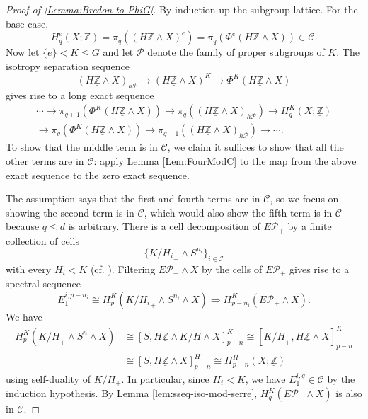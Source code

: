 \documentclass[11pt]{amsart}
\theoremstyle{definition}
\numberwithin{equation}{subsection} %
\newcommand{\sm}{\wedge}
\newcommand{\Z}{\mathbb{Z}}
\begin{document}
\begin{proof}[Proof of \cref{Lemma:Bredon-to-PhiG}]
By induction up the subgroup lattice. For the base case, 
$$ H^e_q(X; \underline{\Z}) = \pi_q((H\underline{\Z}\sm X)^e) =
\pi_q(\Phi^e(H\underline{\Z}\sm X)) \in \mathcal{C}. $$
Now let $\{ e \} < K\leq G$ and let $\mathcal{P}$ denote the family of proper
subgroups of $K$.
The isotropy separation sequence
$$ (H\underline{\Z}\sm X)_{h\mathcal{P}}\to
(H\underline{\Z}\sm X)^K\to \Phi^K(H\underline{\Z}\sm X)$$
gives rise to a long exact sequence
\begin{gather*}
\cdots \to \pi_{q+1}(\Phi^K(H\underline{\Z}\sm X))\to \pi_q((H\underline{\Z}\sm X)_{h\mathcal{P}}) \to H^K_q(X; \underline{\Z}) 
\\\to \pi_q(\Phi^K(H\underline{\Z}\sm X)) \to \pi_{q-1}((H\underline{\Z}\sm X)_{h\mathcal{P}}) \to \cdots. 
\end{gather*}
To show that the middle term is in $\mathcal{C}$, we claim it suffices to show that all
the other terms are in $\mathcal{C}$: apply Lemma \ref{Lem:FourModC}
to the map from the above exact sequence to the zero exact sequence.

The assumption says that the first and fourth terms are in $\mathcal{C}$, so we
focus on showing the second term is in $\mathcal{C}$, which would also show the fifth
term is in $\mathcal{C}$ because $q\leq d$ is arbitrary.
There is a cell decomposition of $E\mathcal{P}_+$ by a finite collection of
cells
$$ \{ {K/H_i}_+ \sm S^{n_i} \}_{i\in \mathcal{I}} $$
with every $H_i < K$ (cf. \cite[Section 2.5.2]{HHR16}). Filtering $E\mathcal{P}_+\sm X$ by the cells of
$E\mathcal{P}_+$ gives rise to a spectral sequence
$$ E_1^{i,p-n_i} \cong H_p^K({K/H_i}_+\sm S^{n_i}\sm X)
\Rightarrow H^K_{p-n_i}(E\mathcal{P}_+\sm X). $$
We have
\begin{align*}
H^K_p({K/H}_+\sm S^n\sm X)  & \cong [S, H\underline{\Z}\sm K/H\sm X]^K_{p-n}
\cong [{K/H}_+, H\underline{\Z}\sm X]^K_{p-n}
\\ & \cong [S, H\underline{\Z}\sm X]^H_{p-n} \cong H^H_{p-n}(X;\underline{\Z})
\end{align*}
using self-duality of $K/H_+$. In particular, since $H_i<K$, 
we have $E_1^{i,q}\in \mathcal{C}$ by the induction hypothesis. By Lemma
\ref{lem:sseq-iso-mod-serre}, $H^K_q(E\mathcal{P}_+\sm X)$ is also in
$\mathcal{C}$.
\end{proof}
\end{document}
